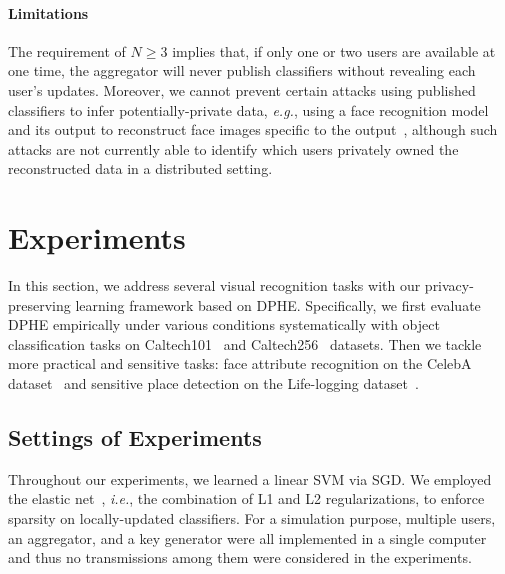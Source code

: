 \documentclass[10pt,twocolumn,letterpaper]{article}
\def\eg{{\it e.g.}}
\def\ie{{\it i.e.}}
\begin{document}
\paragraph{Limitations} The requirement of $N\geq 3$ implies that, if only one or two users are available at one time, the aggregator will never publish classifiers without revealing each user's updates. Moreover, we cannot prevent certain attacks using published classifiers to infer potentially-private data, \eg, using a face recognition model and its output to reconstruct face images specific to the output~\cite{Fredrikson2015}, although such attacks are not currently able to identify which users privately owned the reconstructed data in a distributed setting.

\section{Experiments}
\label{sec:exp}
In this section, we address several visual recognition tasks with our privacy-preserving learning framework based on DPHE. Specifically, we first evaluate DPHE empirically under various conditions systematically with object classification tasks on Caltech101~\cite{Fei-Fei2007a} and Caltech256~\cite{Griffin2007a} datasets. Then we tackle more practical and sensitive tasks: face attribute recognition on the CelebA dataset~\cite{Liu2015a} and sensitive place detection on the Life-logging dataset~\cite{Fan2016a}.

\subsection{Settings of Experiments}
\label{subsec:exp_setting}
Throughout our experiments, we learned a linear SVM via SGD. We employed the elastic net~\cite{Zou2005a}, \ie, the combination of L1 and L2 regularizations, to enforce sparsity on locally-updated classifiers. For a simulation purpose, multiple users, an aggregator, and a key generator were all implemented in a single computer and thus no transmissions among them were considered in the experiments.
\end{document}
